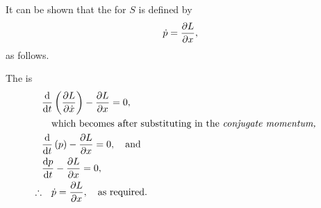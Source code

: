 It can be shown that the \el for $S$ is defined by
\[
	\dot{p} = \pderiv{L}{x},
\]
as follows.

The \el is
\begin{align*}
	&\ELEd{L}{t}{x},\\
	&\qtq{which becomes after substituting in the \textit{conjugate momentum,}}\\
	&\deriv{}{t}\lr{p} - \pderiv{L}{x}=0,\qtq{and}\\
	&\deriv{p}{t}-\pderiv{L}{x}=0,\\
	\therefore&\quad \dot{p}=\pderiv{L}{x},\qtq{as required.}
\end{align*}


